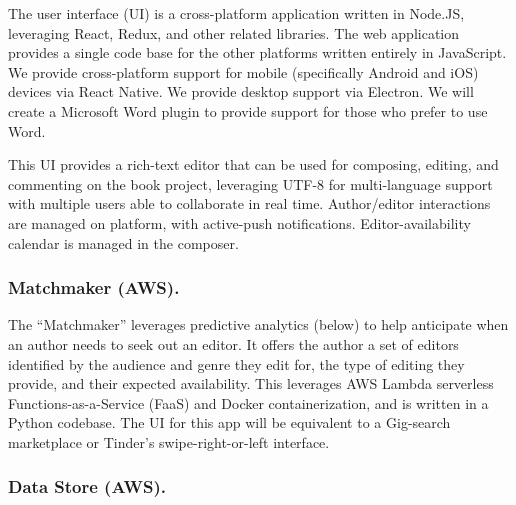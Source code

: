 \documentclass[10pt,openany]{book}
\begin{document}
The user interface (UI) is a cross-platform application written in
Node.JS, leveraging React, Redux, and other related libraries. The web
application provides a single code base for the other platforms written
entirely in JavaScript. We provide cross-platform support for mobile
(specifically Android and iOS) devices via React Native. We provide
desktop support via Electron. We will create a Microsoft Word plugin to
provide support for those who prefer to use Word.

This UI provides a rich-text editor that can be used for composing,
editing, and commenting on the book project, leveraging UTF-8 for
multi-language support with multiple users able to collaborate in real
time. Author/editor interactions are managed on platform, with
active-push notifications. Editor-availability calendar is managed in
the composer.

\hypertarget{matchmaker-aws.}{%
\subsubsection{Matchmaker (AWS).}\label{matchmaker-aws.}}

The ``Matchmaker'' leverages predictive analytics (below) to help
anticipate when an author needs to seek out an editor. It offers the
author a set of editors identified by the audience and genre they edit
for, the type of editing they provide, and their expected availability.
This leverages AWS Lambda serverless Functions-as-a-Service (FaaS) and
Docker containerization, and is written in a Python codebase. The UI for
this app will be equivalent to a Gig-search marketplace or Tinder's
swipe-right-or-left interface.

\hypertarget{data-store-aws.}{%
\subsubsection{Data Store (AWS).}\label{data-store-aws.}}
\end{document}
